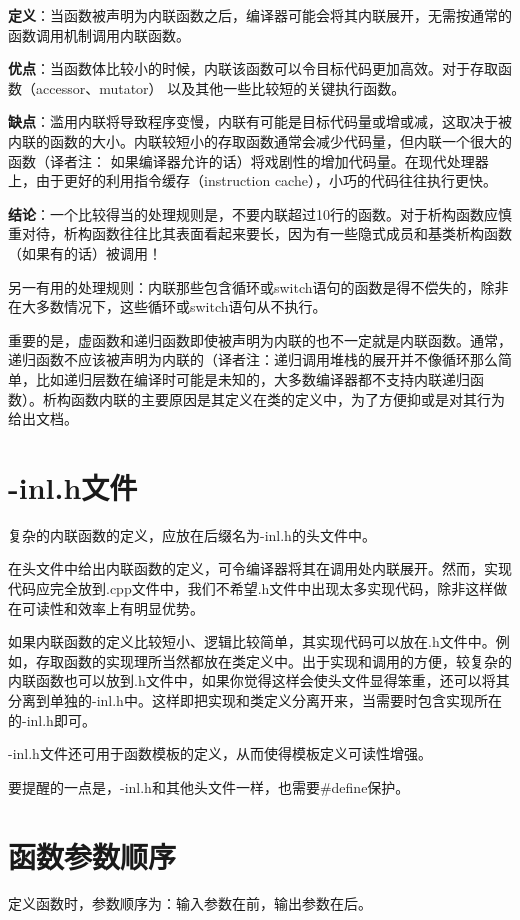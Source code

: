\textbf{定义}：当函数被声明为内联函数之后，编译器可能会将其内联展开，无需按通常的函数调用机制调用内联函数。

\textbf{优点}：当函数体比较小的时候，内联该函数可以令目标代码更加高效。对于存取函数（accessor、mutator） 以及其他一些比较短的关键执行函数。

\textbf{缺点}：滥用内联将导致程序变慢，内联有可能是目标代码量或增或减，这取决于被内联的函数的大小。内联较短小的存取函数通常会减少代码量，但内联一个很大的函数（译者注： 如果编译器允许的话）将戏剧性的增加代码量。在现代处理器上，由于更好的利用指令缓存（instruction cache），小巧的代码往往执行更快。

\textbf{结论}：一个比较得当的处理规则是，不要内联超过10行的函数。对于析构函数应慎重对待，析构函数往往比其表面看起来要长，因为有一些隐式成员和基类析构函数（如果有的话）被调用！

另一有用的处理规则：内联那些包含循环或switch语句的函数是得不偿失的，除非在大多数情况下，这些循环或switch语句从不执行。

重要的是，虚函数和递归函数即使被声明为内联的也不一定就是内联函数。通常，递归函数不应该被声明为内联的（译者注：递归调用堆栈的展开并不像循环那么简单，比如递归层数在编译时可能是未知的，大多数编译器都不支持内联递归函数）。析构函数内联的主要原因是其定义在类的定义中，为了方便抑或是对其行为给出文档。


\section{-inl.h文件}
复杂的内联函数的定义，应放在后缀名为-inl.h的头文件中。

在头文件中给出内联函数的定义，可令编译器将其在调用处内联展开。然而，实现代码应完全放到.cpp文件中，我们不希望.h文件中出现太多实现代码，除非这样做在可读性和效率上有明显优势。

如果内联函数的定义比较短小、逻辑比较简单，其实现代码可以放在.h文件中。例如，存取函数的实现理所当然都放在类定义中。出于实现和调用的方便，较复杂的内联函数也可以放到.h文件中，如果你觉得这样会使头文件显得笨重，还可以将其分离到单独的-inl.h中。这样即把实现和类定义分离开来，当需要时包含实现所在的-inl.h即可。

-inl.h文件还可用于函数模板的定义，从而使得模板定义可读性增强。

要提醒的一点是，-inl.h和其他头文件一样，也需要\#define保护。


\section{函数参数顺序}
定义函数时，参数顺序为：输入参数在前，输出参数在后。

